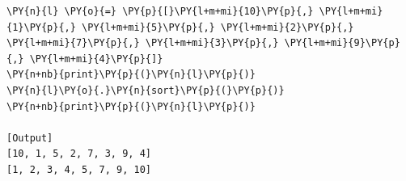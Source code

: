 \begin{Verbatim}[label=\makebox{\url{https://github.com/lucabaldini/cmepda/tree/master/slides/latex/snippets/timsort.py}},commandchars=\\\{\}]
\PY{n}{l} \PY{o}{=} \PY{p}{[}\PY{l+m+mi}{10}\PY{p}{,} \PY{l+m+mi}{1}\PY{p}{,} \PY{l+m+mi}{5}\PY{p}{,} \PY{l+m+mi}{2}\PY{p}{,} \PY{l+m+mi}{7}\PY{p}{,} \PY{l+m+mi}{3}\PY{p}{,} \PY{l+m+mi}{9}\PY{p}{,} \PY{l+m+mi}{4}\PY{p}{]}
\PY{n+nb}{print}\PY{p}{(}\PY{n}{l}\PY{p}{)}
\PY{n}{l}\PY{o}{.}\PY{n}{sort}\PY{p}{(}\PY{p}{)}
\PY{n+nb}{print}\PY{p}{(}\PY{n}{l}\PY{p}{)}

[Output]
[10, 1, 5, 2, 7, 3, 9, 4]
[1, 2, 3, 4, 5, 7, 9, 10]
\end{Verbatim}